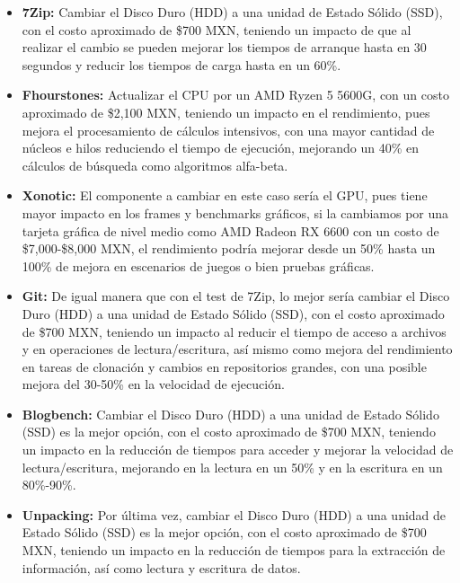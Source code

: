 \documentclass[12pt]{article}
\begin{document}
\begin{enumerate}[label=(\arabic{section}.\arabic{subsection}.\arabic{enumi})]
\begin{itemize}
    	\item \textbf{7Zip:} Cambiar el Disco Duro (HDD) a una unidad de Estado Sólido (SSD), con el costo aproximado de \$700 MXN, teniendo un impacto de que al realizar el cambio se pueden mejorar los tiempos de arranque hasta en 30 segundos y reducir los tiempos de carga hasta en un 60\%.
    	
    	\item \textbf{Fhourstones:} Actualizar el CPU por un AMD Ryzen 5 5600G, con un costo aproximado de \$2,100 MXN, teniendo un impacto en el rendimiento, pues mejora el procesamiento de cálculos intensivos, con una mayor cantidad de núcleos e hilos reduciendo el tiempo de ejecución, mejorando un 40\% en cálculos de búsqueda como algoritmos alfa-beta.
    	
    	\item \textbf{Xonotic:} El componente a cambiar en este caso sería el GPU, pues tiene mayor impacto en los frames y benchmarks gráficos, si la cambiamos por una tarjeta gráfica de nivel medio como AMD Radeon RX 6600 con un costo de \$7,000-\$8,000 MXN, el rendimiento podría mejorar desde un 50\% hasta un 100\% de mejora en escenarios de juegos o bien pruebas gráficas.
    	
    	\item \textbf{Git:} De igual manera que con el test de 7Zip, lo mejor sería cambiar el Disco Duro (HDD) a una unidad de Estado Sólido (SSD), con el costo aproximado de \$700 MXN, teniendo un impacto al reducir el tiempo de acceso a archivos y en operaciones de lectura/escritura, así mismo como mejora del rendimiento en tareas de clonación y cambios en repositorios grandes, con una posible mejora del 30-50\% en la velocidad de ejecución.
    	
    	\item \textbf{Blogbench:} Cambiar el Disco Duro (HDD) a una unidad de Estado Sólido (SSD) es la mejor opción, con el costo aproximado de \$700 MXN, teniendo un impacto en la reducción de tiempos para acceder y mejorar la velocidad de lectura/escritura, mejorando en la lectura en un 50\% y en la escritura en un 80\%-90\%.
    	
    	\item \textbf{Unpacking:} Por última vez, cambiar el Disco Duro (HDD) a una unidad de Estado Sólido (SSD) es la mejor opción, con el costo aproximado de \$700 MXN, teniendo un impacto en la reducción de tiempos para la extracción de información, así como lectura y escritura de datos.
    	

\end{itemize}
\end{enumerate}
\end{document}
